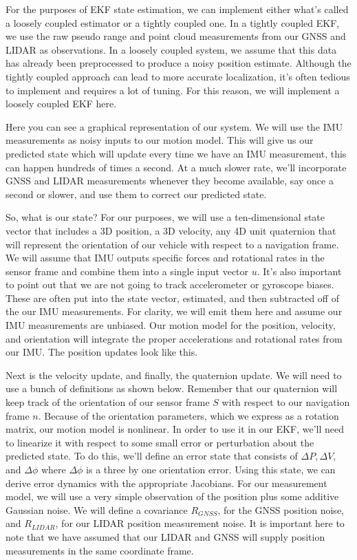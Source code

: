 For the purposes of EKF state estimation, we can implement either what's called a loosely coupled estimator or a
tightly coupled one. In a tightly coupled EKF, we use the raw pseudo range and point cloud measurements from our GNSS and LIDAR
as observations. In a loosely coupled system, we assume that this data has already been preprocessed to produce a noisy
position estimate. Although the tightly coupled approach can lead to more accurate localization, it's often tedious
to implement and requires a lot of tuning. For this reason, we will implement a loosely coupled EKF here. 

Here you can see a graphical representation
of our system. We will use the IMU measurements as noisy inputs to
our motion model. This will give us our predicted state which will update every time we have an IMU measurement, this can happen hundreds
of times a second. At a much slower rate, we'll incorporate GNSS and LIDAR measurements whenever they become available, say once a second
or slower, and use them to correct our predicted state. 

So, what is our state? For our purposes, we will use a ten-dimensional
state vector that includes a 3D position, a 3D velocity, any 4D unit
quaternion that will represent the orientation of our vehicle with respect to a navigation frame. We will assume
that IMU outputs specific forces and rotational rates in the sensor frame and combine them into a single
input vector $u$. It's also important to point out that we are not going to track accelerometer
or gyroscope biases. These are often put into the state vector, estimated, and then subtracted off of the our IMU
measurements. For clarity, we will emit them here and assume our IMU measurements
are unbiased. Our motion model for the position, velocity, and orientation
will integrate the proper accelerations and rotational rates
from our IMU. The position updates look like this. 

Next is the velocity update, and finally, the quaternion update. We will need to use
a bunch of definitions as shown below. Remember that our quaternion will keep track of
the orientation of our sensor frame $S$ with respect to
our navigation frame $n$. Because of the orientation parameters, which we express as
a rotation matrix, our motion model is nonlinear. In order to use it in our EKF, we'll need to linearize
it with respect to some small error or perturbation about
the predicted state. To do this, we'll define an error state that
consists of $\Delta P, \Delta V$, and $\Delta \phi$ where $\Delta \phi$ is a three by one orientation error. Using this state,
we can derive error dynamics with the appropriate Jacobians. For our measurement model, we will use a very
simple observation of the position plus some additive Gaussian noise. We will define
a covariance $R_{GNSS}$, for the GNSS
position noise, and $R_{LIDAR}$, for our LIDAR position measurement noise. It is important here
to note that we have assumed that our LIDAR and GNSS will supply
position measurements in the same
coordinate frame. 

